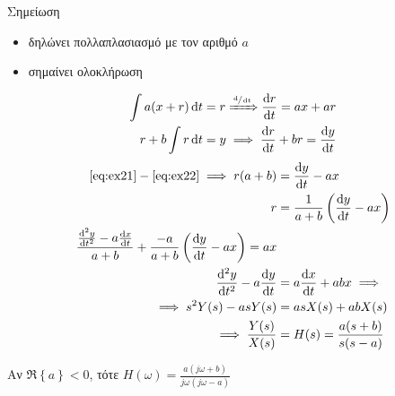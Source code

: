 \documentclass[11pt,a4paper,notitlepage,fleqn,final]{article}
\begin{document}
   \begin{infobox}{Σημείωση}
   	\begin{itemize}
   	\item {}\hspace{.7em} δηλώνει πολλαπλασιασμό με τον αριθμό \( a \)
   	\item {}\hspace{.7em} σημαίνει ολοκλήρωση
   	\end{itemize}
   \end{infobox}


   \begin{align}
   	\int a(x+r) \dif t &= r \xRightarrow{\sfrac{\dif}{\dif t} } \od{r}{t} = ax+ar
   	 \label{eq:ex21}
   	\\ r+b\int r\dif t &= y \implies \od{r}{t} + br = \od{y}{t} \label{eq:ex22}
   	\end{align}
   	\begin{align*}
   	\eqref{eq:ex21} - \eqref{eq:ex22} \implies r(a+b) &= \od{y}{t} - ax \\
   	r &= \frac{1}{a+b} \left(\od{y}{t} - ax\right) \\
   	\frac{\od[2]{y}{t}-a\od{x}{t}}{a+b} + \frac{-a}{a+b} \left(
   	\od{y}{t}-ax
   	\right) = ax \\
   	\od[2]{y}{t} - a\od{y}{t} &= a\od{x}{t} + abx
   	\implies \\ \implies s^2Y(s) - asY(s) &= asX(s) + abX(s) \\
   	\implies \frac{Y(s)}{X(s)} &= H(s) = \frac{a(s+b)}{s(s-a)}
   \end{align*}

   Αν \( \Re\left\lbrace a \right\rbrace < 0 \), τότε
   \( \displaystyle H(\omega ) = \frac{a(j\omega +b)}{j\omega (j\omega -a)} \)
\end{document}
